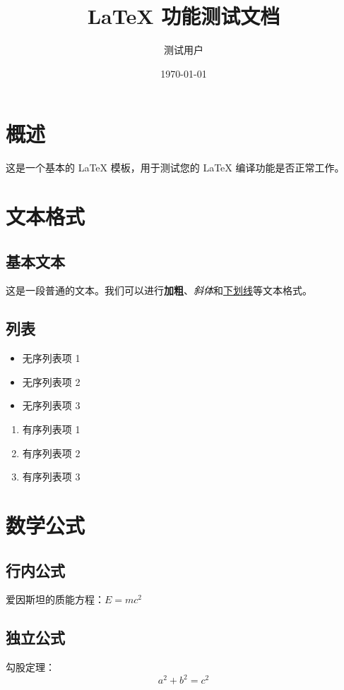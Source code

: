 \documentclass{article}
\title{LaTeX 功能测试文档}
\author{测试用户}
\date{\today}
\begin{document}
\maketitle

\section*{概述}
这是一个基本的 LaTeX 模板，用于测试您的 LaTeX 编译功能是否正常工作。

\section{文本格式}

\subsection{基本文本}
这是一段普通的文本。我们可以进行\textbf{加粗}、\textit{斜体}和\underline{下划线}等文本格式。

\subsection{列表}
\begin{itemize}
    \item 无序列表项 1
    \item 无序列表项 2
    \item 无序列表项 3
\end{itemize}

\begin{enumerate}
    \item 有序列表项 1
    \item 有序列表项 2
    \item 有序列表项 3
\end{enumerate}

\section{数学公式}

\subsection{行内公式}
爱因斯坦的质能方程：$E = mc^2$

\subsection{独立公式}
勾股定理：
\[
a^2 + b^2 = c^2
\]
\end{document}
